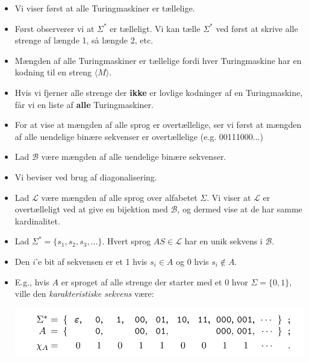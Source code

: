 \begin{frame}[allowframebreaks]
	\begin{itemize}
		\item Vi viser først at alle Turingmaskiner er tællelige.
		\item Først observerer vi at $\Sigma^{*}$ er tælleligt. Vi kan tælle $\Sigma^{*}$ ved først at skrive alle strenge af længde 1, så længde 2, etc.
		\item Mængden af alle Turingmaskiner er tællelige fordi hver Turingmaskine har en kodning til en streng \(\langle M \rangle\).
		\item Hvis vi fjerner alle strenge der \textbf{ikke} er lovlige kodninger af en Turingmaskine, får vi en liste af \textbf{alle} Turingmaskiner.
		\item For at vise at mængden af alle sprog er overtællelige, ser vi først at mængden af alle uendelige binære sekvenser er overtællelige (e.g. 00111000$\ldots$)
		\item Lad $\mathcal{B}$ være mængden af alle uendelige binære sekvenser.
		\item Vi beviser ved brug af diagonalisering.
		\item Lad $\mathcal{L}$ være mængden af alle sprog over alfabetet $\Sigma$. Vi viser at $\mathcal{L}$ er overtælleligt ved at give en bijektion med $\mathcal{B}$, og dermed vise at de har samme kardinalitet.
		\item Lad $\Sigma^{*} = \{s_{1}, s_{2}, s_{3}, \ldots\}$. Hvert sprog $AS \in \mathcal{L}$ har en unik sekvens i $\mathcal{B}$.
		\item Den $i$'e bit af sekvensen er et 1 hvis $s_{i} \in A$ og $0$ hvis $s_{i} \notin A$.
		\item E.g., hvis $A$ er sproget af alle strenge der starter med et $0$ hvor $\Sigma = \{0,1\}$, ville den \textit{karakteristiske sekvens} være:
		      \begin{center}
			      \includegraphics[scale=0.3]{figur/karsekv.png}
		      \end{center}
	\end{itemize}
\end{frame}






